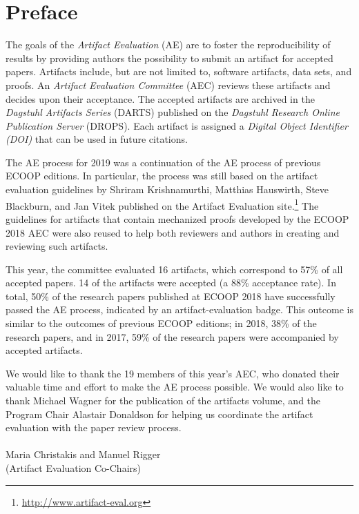 \documentclass[a4paper,UKenglish]{dartsmaster-v2019}
\begin{document}
\chapter{Preface} %

The goals of the \emph{Artifact Evaluation} (AE) are to foster the reproducibility of results by providing authors the possibility to submit an artifact for accepted papers.
Artifacts include, but are not limited to, software artifacts, data sets, and proofs.
An \emph{Artifact Evaluation Committee} (AEC) reviews these artifacts and decides upon their acceptance.
The accepted artifacts are archived in the \emph{Dagstuhl Artifacts Series} (DARTS) published on the \emph{Dagstuhl Research Online Publication Server} (DROPS).
Each artifact is assigned a \emph{Digital Object Identifier (DOI)} that can be used in future citations.

The AE process for 2019 was a continuation of the AE process of previous ECOOP editions.
In particular, the process was still based on the artifact evaluation guidelines by Shriram Krishnamurthi, Matthias Hauswirth, Steve Blackburn, and Jan Vitek published on the Artifact Evaluation site.\footnote{\url{http://www.artifact-eval.org}}
The guidelines for artifacts that contain mechanized proofs developed by the ECOOP 2018 AEC  were also reused to help both reviewers and authors in creating and reviewing such artifacts.

This year, the committee evaluated 16 artifacts, which correspond to 57\% of all accepted papers. %
14 of the artifacts were accepted (a 88\% acceptance rate).
In total, 50\% of the research
papers published at ECOOP 2018 have successfully passed the AE process, indicated by an artifact-evaluation badge.
This outcome is similar to the outcomes of previous ECOOP editions; in 2018, 38\% of the research papers, and in 2017, 59\% of the research papers were accompanied by accepted artifacts.

We would like to thank the 19 members of this year's AEC, who donated their valuable time and effort to make the AE process possible.
We would also like to thank Michael Wagner for the publication of the artifacts volume, and the Program Chair Alastair Donaldson for helping us coordinate the artifact evaluation with the paper review process.
\\\\
Maria Christakis and Manuel Rigger\\
(Artifact Evaluation Co-Chairs)
\end{document}
